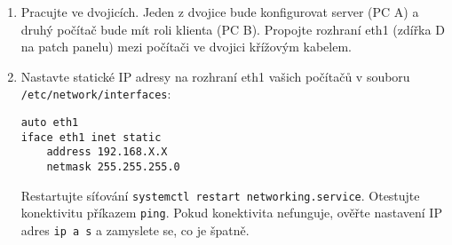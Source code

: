 \begin{enumerate}

  \item Pracujte ve dvojicích. Jeden z dvojice bude konfigurovat server (PC A)
    a druhý počítač bude mít roli klienta (PC B). Propojte rozhraní eth1 (zdířka
    D na patch panelu)
    mezi počítači ve dvojici křížovým kabelem.
  \item Nastavte statické IP adresy na rozhraní eth1 vašich počítačů v souboru
    \\
    {\tt /etc/network/interfaces}:
\begin{verbatim}    
auto eth1
iface eth1 inet static
    address 192.168.X.X
    netmask 255.255.255.0
\end{verbatim}    
    Restartujte síťování {\tt systemctl restart networking.service}.
    Otestujte konektivitu příkazem {\tt ping}. Pokud konektivita nefunguje,
    ověřte nastavení IP adres {\tt ip a s} a zamyslete se, co je špatně.


\end{enumerate}
